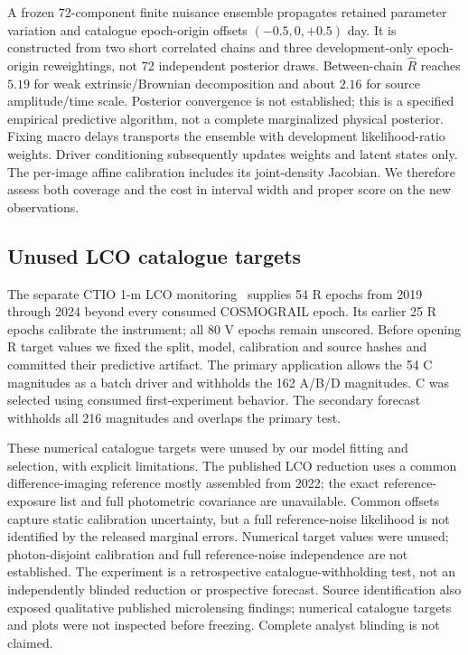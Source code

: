 A frozen 72-component finite nuisance ensemble propagates retained
parameter variation and catalogue epoch-origin offsets $(-0.5,0,+0.5)$ day. It is
constructed from two short correlated chains and three development-only
epoch-origin reweightings, not 72 independent posterior draws. Between-chain
$\widehat R$ reaches $5.19$ for weak extrinsic/Brownian decomposition
and about $2.16$ for source amplitude/time scale. Posterior convergence
is not established; this is a specified empirical predictive algorithm,
not a complete marginalized physical posterior. Fixing macro delays
transports the ensemble with development likelihood-ratio weights.
Driver conditioning subsequently updates weights and latent states only.
The per-image affine calibration includes its joint-density Jacobian.
We therefore assess both coverage and the cost in interval width and
proper score on the new observations.

\subsection{Unused LCO catalogue targets}
The separate CTIO 1-m LCO monitoring~\cite{Sorgenfrei2025} supplies
54 R epochs from 2019 through 2024 beyond every consumed COSMOGRAIL
epoch. Its earlier 25 R epochs calibrate the instrument; all 80 V epochs
remain unscored. Before opening R target values we fixed the split,
model, calibration and source hashes and committed their predictive
artifact. The primary application allows the 54 C magnitudes as a batch
driver and withholds the 162 A/B/D magnitudes. C was selected using
consumed first-experiment behavior. The secondary forecast withholds all
216 magnitudes and overlaps the primary test.

These numerical catalogue targets were unused by our model fitting and
selection, with explicit limitations. The published LCO reduction
uses a common difference-imaging reference mostly assembled from 2022;
the exact reference-exposure list and full photometric covariance are
unavailable. Common offsets capture static calibration uncertainty,
but a full reference-noise likelihood is not identified by the released
marginal errors. Numerical target values were unused; photon-disjoint calibration and full
reference-noise independence are not established. The experiment is a
retrospective catalogue-withholding test, not an independently blinded
reduction or prospective forecast.
Source identification also exposed qualitative published microlensing
findings; numerical catalogue targets and plots were not inspected
before freezing. Complete analyst blinding is not claimed.





